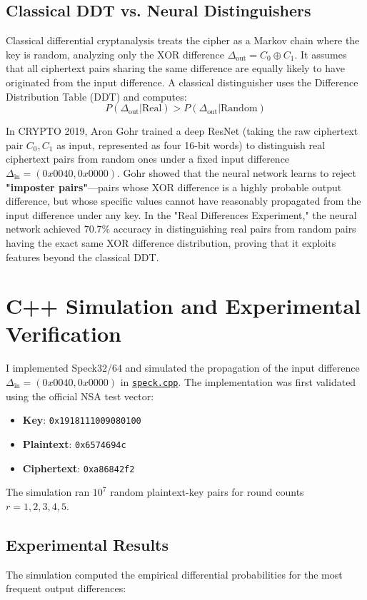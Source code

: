 \documentclass{article}
\begin{document}
\subsection{Classical DDT vs. Neural Distinguishers}
Classical differential cryptanalysis treats the cipher as a Markov chain where the key is random, analyzing only the XOR difference $\Delta_{\text{out}} = C_0 \oplus C_1$. It assumes that all ciphertext pairs sharing the same difference are equally likely to have originated from the input difference. A classical distinguisher uses the Difference Distribution Table (DDT) and computes:
\[ P(\Delta_{\text{out}} | \text{Real}) > P(\Delta_{\text{out}} | \text{Random}) \]

In CRYPTO 2019, Aron Gohr trained a deep ResNet (taking the raw ciphertext pair $C_0, C_1$ as input, represented as four 16-bit words) to distinguish real ciphertext pairs from random ones under a fixed input difference $\Delta_{\text{in}} = (0x0040, 0x0000)$.
Gohr showed that the neural network learns to reject \textbf{"imposter pairs"}---pairs whose XOR difference is a highly probable output difference, but whose specific values cannot have reasonably propagated from the input difference under any key. In the "Real Differences Experiment," the neural network achieved $70.7\%$ accuracy in distinguishing real pairs from random pairs having the exact same XOR difference distribution, proving that it exploits features beyond the classical DDT.

\section{C++ Simulation and Experimental Verification}
I implemented Speck32/64 and simulated the propagation of the input difference $\Delta_{\text{in}} = (0x0040, 0x0000)$ in \href{file:///home/scorzion/Tech/Crypto/SKC_IITH/Day8/solutions/speck.cpp}{\texttt{speck.cpp}}. The implementation was first validated using the official NSA test vector:
\begin{itemize}
    \item \textbf{Key}: \texttt{0x1918111009080100}
    \item \textbf{Plaintext}: \texttt{0x6574694c}
    \item \textbf{Ciphertext}: \texttt{0xa86842f2}
\end{itemize}
The simulation ran $10^7$ random plaintext-key pairs for round counts $r = 1, 2, 3, 4, 5$.

\subsection{Experimental Results}
The simulation computed the empirical differential probabilities for the most frequent output differences:
\end{document}
